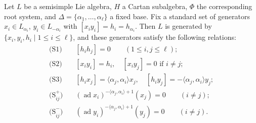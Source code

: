 Let $L$ be a semisimple Lie algebra, $H$ a Cartan subalgebra, $\Phi$ the corresponding root system, and $\Delta = \{\alpha_1, \ldots, \alpha_\ell\}$ a fixed base. Fix a standard set of generators $x_i \in L_{\alpha_i}$, $y_i \in L_{-\alpha_i}$ with $[x_i y_i] = h_i = h_{\alpha_i}$. Then $L$ is generated by $\{x_i, y_i, h_i \mid 1 \leq i \leq \ell\}$, and these generators satisfy the following relations:
\begin{align*}
\text{(S1)} &\quad [h_i h_j] = 0 \qquad (1 \leq i, j \leq \ell);\\
\text{(S2)} &\quad [x_i y_i] = h_i, \quad [x_i y_j] = 0 \text{ if } i \neq j;\\
\text{(S3)} &\quad [h_i x_j] = \langle \alpha_j, \alpha_i \rangle x_j, \quad [h_i y_j] = -\langle \alpha_j, \alpha_i \rangle y_j;\\
\text{(S}_{ij}^+) &\quad (\operatorname{ad} x_i)^{-\langle \alpha_j, \alpha_i \rangle + 1}(x_j) = 0 \qquad (i \neq j);\\
\text{(S}_{ij}^-) &\quad (\operatorname{ad} y_i)^{-\langle \alpha_j, \alpha_i \rangle + 1}(y_j) = 0 \qquad (i \neq j).
\end{align*}
